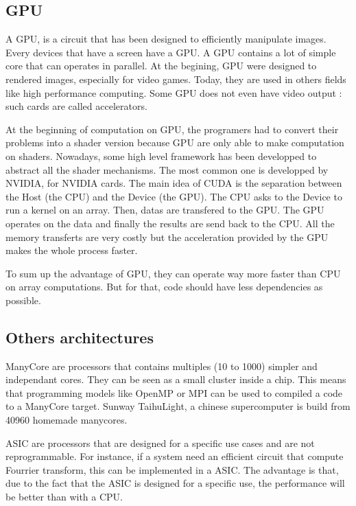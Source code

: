\subsection{GPU}
A \ac{GPU}, is a circuit that has been designed to efficiently manipulate images. Every devices that have a screen have a \ac{GPU}. A \ac{GPU} contains a lot of simple core that can operates in parallel. At the begining, \ac{GPU} were designed to rendered images, especially for video games. Today, they are used in others fields like high performance computing. Some \ac{GPU} does not even have video output : such cards are called accelerators.

At the beginning of computation on \ac{GPU}, the programers had to convert their problems into a shader version because \ac{GPU} are only able to make computation on shaders. Nowadays, some high level framework has been developped to abstract all the shader mechanisms. The most common one is  developped by NVIDIA, for NVIDIA cards. The main idea of CUDA is the separation between the Host (the \ac{CPU}) and the Device (the \ac{GPU}). The \ac{CPU} asks to the Device to run a kernel on an array. Then, datas are transfered to the \ac{GPU}. The \ac{GPU} operates on the data and finally the results are send back to the \ac{CPU}. All the memory transferts are very costly but the acceleration provided by the \ac{GPU} makes the whole process faster. 

To sum up the advantage of \ac{GPU}, they can operate way more faster than \ac{CPU} on array computations. But for that, code should have less dependencies as possible.

\subsection{Others architectures}
ManyCore are processors that contains multiples (10 to 1000) simpler and independant cores. They can be seen as a small cluster inside a chip. This means that programming models like OpenMP or \ac{MPI} can be used to compiled a code to a ManyCore target. Sunway TaihuLight, a chinese supercomputer is build from 40960 homemade manycores.

\ac{ASIC} are processors that are designed for a specific use cases and are not reprogrammable. For instance, if a system need an efficient circuit that compute Fourrier transform, this can be implemented in a \ac{ASIC}. The advantage is that, due to the fact that the \ac{ASIC} is designed for a specific use, the performance will be better than with a \ac{CPU}.

